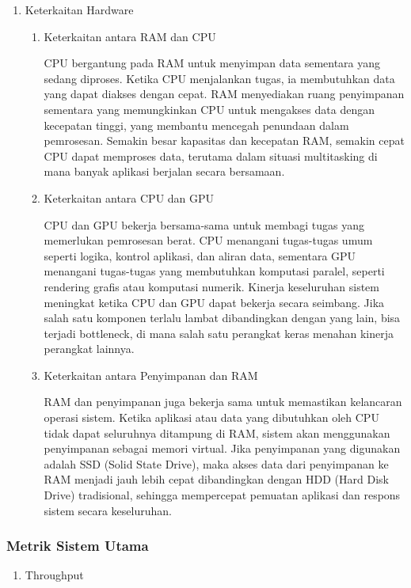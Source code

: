 \documentclass[12pt]{article}
\begin{document}
\begin{enumerate}
    \item {Keterkaitan Hardware}
    \par \begin{enumerate}
        \item {{Keterkaitan antara RAM dan CPU}}
        \par CPU bergantung pada RAM untuk menyimpan data sementara yang sedang diproses. Ketika CPU menjalankan tugas, ia membutuhkan data yang dapat diakses dengan cepat. RAM menyediakan ruang penyimpanan sementara yang memungkinkan CPU untuk mengakses data dengan kecepatan tinggi, yang membantu mencegah penundaan dalam pemrosesan. Semakin besar kapasitas dan kecepatan RAM, semakin cepat CPU dapat memproses data, terutama dalam situasi multitasking di mana banyak aplikasi berjalan secara bersamaan.
    
        \item {{Keterkaitan antara CPU dan GPU}}
        \par CPU dan GPU bekerja bersama-sama untuk membagi tugas yang memerlukan pemrosesan berat. CPU menangani tugas-tugas umum seperti logika, kontrol aplikasi, dan aliran data, sementara GPU menangani tugas-tugas yang membutuhkan komputasi paralel, seperti rendering grafis atau komputasi numerik. Kinerja keseluruhan sistem meningkat ketika CPU dan GPU dapat bekerja secara seimbang. Jika salah satu komponen terlalu lambat dibandingkan dengan yang lain, bisa terjadi bottleneck, di mana salah satu perangkat keras menahan kinerja perangkat lainnya.
    
        \item {{Keterkaitan antara Penyimpanan dan RAM}}
        \par RAM dan penyimpanan juga bekerja sama untuk memastikan kelancaran operasi sistem. Ketika aplikasi atau data yang dibutuhkan oleh CPU tidak dapat seluruhnya ditampung di RAM, sistem akan menggunakan penyimpanan sebagai memori virtual. Jika penyimpanan yang digunakan adalah SSD (Solid State Drive), maka akses data dari penyimpanan ke RAM menjadi jauh lebih cepat dibandingkan dengan HDD (Hard Disk Drive) tradisional, sehingga mempercepat pemuatan aplikasi dan respons sistem secara keseluruhan.
    
    \end{enumerate} 

\end{enumerate}
    
\subsubsection{Metrik Sistem Utama}
\begin{enumerate}
    \item Throughput
\end{enumerate}
\end{document}
